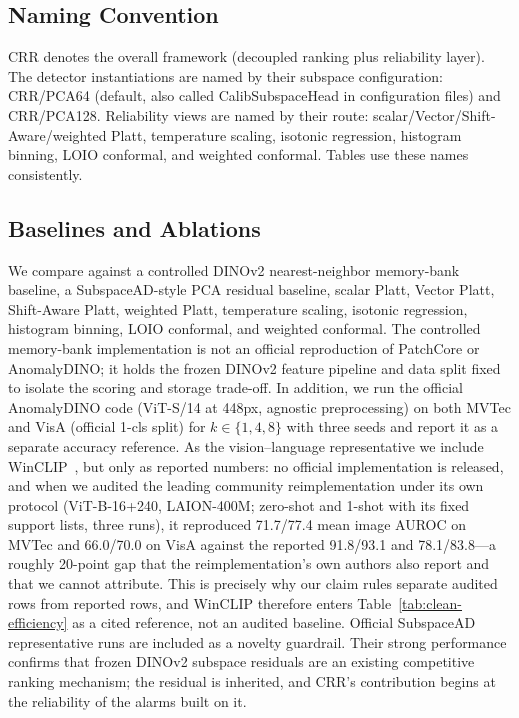 \subsection{Naming Convention}
CRR denotes the overall framework (decoupled ranking plus reliability layer). The detector instantiations are named by their subspace configuration: CRR/PCA64 (default, also called CalibSubspaceHead in configuration files) and CRR/PCA128. Reliability views are named by their route: scalar/Vector/Shift-Aware/weighted Platt, temperature scaling, isotonic regression, histogram binning, LOIO conformal, and weighted conformal. Tables use these names consistently.

\subsection{Baselines and Ablations}
We compare against a controlled DINOv2 nearest-neighbor memory-bank baseline, a SubspaceAD-style PCA residual baseline, scalar Platt, Vector Platt, Shift-Aware Platt, weighted Platt, temperature scaling, isotonic regression, histogram binning, LOIO conformal, and weighted conformal. The controlled memory-bank implementation is not an official reproduction of PatchCore or AnomalyDINO; it holds the frozen DINOv2 feature pipeline and data split fixed to isolate the scoring and storage trade-off. In addition, we run the official AnomalyDINO code (ViT-S/14 at 448px, agnostic preprocessing) on both MVTec and VisA (official 1-cls split) for $k\in\{1,4,8\}$ with three seeds and report it as a separate accuracy reference. As the vision--language representative we include WinCLIP~\cite{winclip2023}, but only as reported numbers: no official implementation is released, and when we audited the leading community reimplementation under its own protocol (ViT-B-16+240, LAION-400M; zero-shot and 1-shot with its fixed support lists, three runs), it reproduced 71.7/77.4 mean image AUROC on MVTec and 66.0/70.0 on VisA against the reported 91.8/93.1 and 78.1/83.8---a roughly 20-point gap that the reimplementation's own authors also report and that we cannot attribute. This is precisely why our claim rules separate audited rows from reported rows, and WinCLIP therefore enters Table~\ref{tab:clean-efficiency} as a cited reference, not an audited baseline. Official SubspaceAD representative runs are included as a novelty guardrail. Their strong performance confirms that frozen DINOv2 subspace residuals are an existing competitive ranking mechanism; the residual is inherited, and CRR's contribution begins at the reliability of the alarms built on it.

